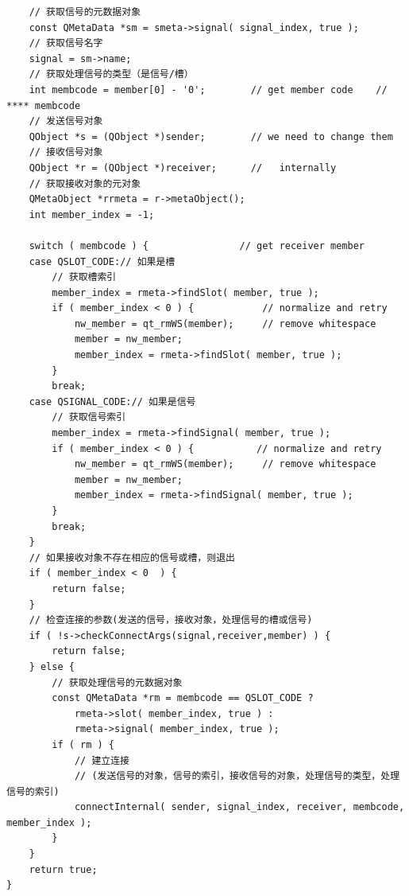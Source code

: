 \documentclass[9pt,b5paper]{article}
\begin{document}
\begin{enumerate}
\begin{lstlisting}
    // 获取信号的元数据对象  
    const QMetaData *sm = smeta->signal( signal_index, true );  
    // 获取信号名字  
    signal = sm->name;         
    // 获取处理信号的类型（是信号/槽）  
    int membcode = member[0] - '0';        // get member code    // **** membcode
    // 发送信号对象  
    QObject *s = (QObject *)sender;        // we need to change them  
    // 接收信号对象  
    QObject *r = (QObject *)receiver;      //   internally  
    // 获取接收对象的元对象  
    QMetaObject *rrmeta = r->metaObject();  
    int member_index = -1;  

    switch ( membcode ) {                // get receiver member  
    case QSLOT_CODE:// 如果是槽  
        // 获取槽索引  
        member_index = rmeta->findSlot( member, true );  
        if ( member_index < 0 ) {            // normalize and retry  
            nw_member = qt_rmWS(member);     // remove whitespace  
            member = nw_member;  
            member_index = rmeta->findSlot( member, true );  
        }  
        break;  
    case QSIGNAL_CODE:// 如果是信号  
        // 获取信号索引  
        member_index = rmeta->findSignal( member, true );  
        if ( member_index < 0 ) {           // normalize and retry  
            nw_member = qt_rmWS(member);     // remove whitespace  
            member = nw_member;  
            member_index = rmeta->findSignal( member, true );  
        }  
        break;  
    }  
    // 如果接收对象不存在相应的信号或槽，则退出  
    if ( member_index < 0  ) {  
        return false;  
    }  
    // 检查连接的参数(发送的信号，接收对象，处理信号的槽或信号)  
    if ( !s->checkConnectArgs(signal,receiver,member) ) {  
        return false;  
    } else {  
        // 获取处理信号的元数据对象  
        const QMetaData *rm = membcode == QSLOT_CODE ?  
            rmeta->slot( member_index, true ) :  
            rmeta->signal( member_index, true );  
        if ( rm ) {            
            // 建立连接  
            // (发送信号的对象，信号的索引，接收信号的对象，处理信号的类型，处理信号的索引)  
            connectInternal( sender, signal_index, receiver, membcode, member_index );  
        }  
    }  
    return true;  
}  


\end{lstlisting}
\end{enumerate}
\end{document}
